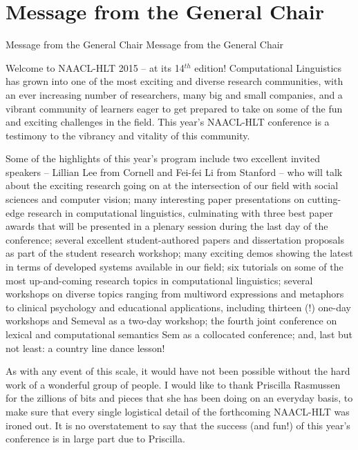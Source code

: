 \section{Message from the General Chair}\vspace{2em}
\setheaders%
    {Message from the General Chair}%
    {Message from the General Chair}
\thispagestyle{emptyheader}

\setlength{\parskip}{1ex}

Welcome to NAACL-HLT 2015 -- at its 14$^{th}$ edition! Computational Linguistics has grown into one of the most exciting and diverse research communities, with an ever increasing number of researchers, many big and small companies, and a vibrant community of learners eager to get prepared to take on some of the fun and exciting challenges in the field.  This year's NAACL-HLT conference is a testimony to the vibrancy and vitality of this community. 

Some of the highlights of this year's program include two excellent invited speakers -- Lillian Lee from Cornell and Fei-fei Li from Stanford -- who will talk about the exciting research going on at the intersection of our field with social sciences and computer vision; many interesting paper presentations on cutting-edge research in computational linguistics, culminating with three best paper awards that will be presented in a plenary session during the last day of the conference; several excellent student-authored papers and dissertation proposals as part of the student research workshop; many exciting demos showing the latest in terms of developed systems available in our field; six tutorials on some of the most up-and-coming research topics in computational linguistics; several workshops on diverse topics ranging from multiword expressions and metaphors to clinical psychology and educational applications, including thirteen (!) one-day workshops and {\sc Semeval} as a two-day workshop;  the fourth joint conference on  lexical and computational semantics {\sc *Sem} as a collocated conference; and, last but not least: a country line dance lesson! 

As with any event of this scale, it would have not been possible without the hard work of a wonderful group of people. 
I would like to thank Priscilla Rasmussen for the zillions of bits and pieces that she has been doing on an everyday basis, to make sure that every single logistical detail of the forthcoming NAACL-HLT was ironed out. It is no overstatement to say that the success (and fun!) of this year's conference is in large part due to Priscilla. 

